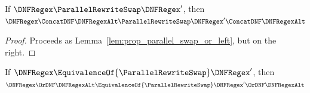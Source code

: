\documentclass[acmsmall,screen]{acmart}
\begin{document}
\begin{mylemma}
  If $\DNFRegex \ParallelRewriteSwap \DNFRegex'$, then\\
  $\DNFRegex \ConcatDNF \DNFRegexAlt \ParallelRewriteSwap \DNFRegex'
  \ConcatDNF \DNFRegexAlt$
\end{mylemma}
\begin{proof}
  Proceeds as Lemma~\ref{lem:prop_parallel_swap_or_left}, but on the right.
\end{proof}

\begin{mylemma}
  \label{lem:prop-eq-swap-or-left}
  If $\DNFRegex \EquivalenceOf{\ParallelRewriteSwap} \DNFRegex'$, then
  $\DNFRegex \OrDNF \DNFRegexAlt \EquivalenceOf{\ParallelRewriteSwap} \DNFRegex'
  \OrDNF \DNFRegexAlt$
\end{mylemma}
\end{document}
